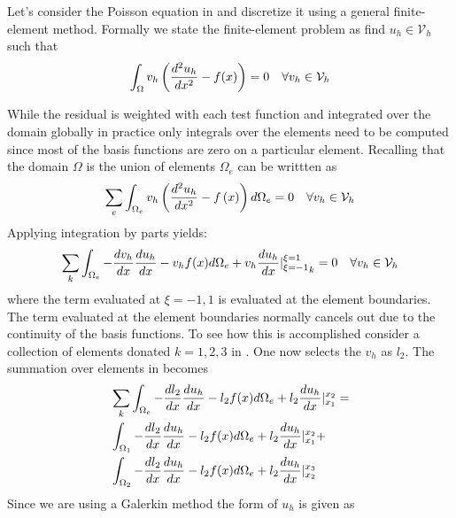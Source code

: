  Let's consider the Poisson equation in  and discretize it using a general finite-element method.  Formally we state the finite-element problem as find $u_{h} \in \mathcal{V}_{h}$ such that
\begin{equation}\label{eq:c2_pois_fem}
\int_{\Omega} v_{h} \left(  \frac{d^{2} u_{h}} {dx^{2}} - f(x)  \right) = 0 \quad \forall v_{h} \in \mathcal{V}_{h}
\end{equation}

While the residual is weighted with each test function and integrated over the domain globally in practice only integrals over the elements need to be computed since most of the basis functions are zero on a particular element.  Recalling that the domain $\Omega$ is the union of elements $\Omega_{e}$  can be writtten as 
\begin{equation}
\sum_{e} \int_{\Omega_{e}} v_{h} \left(  \frac{d^{2} u_{h}}{dx^{2}} - f\left( x \right) \right) d\Omega_{e} = 0 \quad \forall v_{h} \in \mathcal{V}_{h}
\end{equation}
Applying integration by parts yields:
\begin{equation}\label{eq:c2_pois_fem_weak}
\sum_{k}\int_{\Omega_{e} } -\frac{d v_{h}}{d x}\frac{d u_{h}}{d x} - v_{h} f(x) d \Omega_{e} + v_{h}\frac{d u_{h}}{d x} {\vert_{\xi = -1}^{\xi=1}}_{k}= 0 \quad \forall v_{h} \in \mathcal{V}_{h}
\end{equation}
 where the term evaluated at $\xi = -1,1$ is evaluated at the element boundaries.  The term evaluated at the element boundaries normally cancels out due to the continuity of the basis functions.  To see how this is accomplished consider a collection of elements donated $k = 1, 2, 3$ in .  One now selects the $v_{h}$ as $l_{2}$.  The summation over elements in  becomes 
 \begin{equation}
 \begin{split}
 & \sum_{k}\int_{\Omega_{e} } -\frac{d l_{2}}{d x}\frac{d u_{h}}{d x} - l_{2} f(x) d \Omega_{e} + l_{2}\frac{d u_{h}}{d x} \vert_{x_{1}}^{x_{2}}= \\
 & \int_{\Omega_{1} } -\frac{d l_{2}}{d x}\frac{d u_{h}}{d x} - l_{2} f(x) d \Omega_{e} + l_{2}\frac{d u_{h}}{d x}  \vert_{x_{1}}^{x_{2}} + \\ 
 & \int_{\Omega_{2} } -\frac{d l_{2}}{d x}\frac{d u_{h}}{d x} - l_{2} f(x) d \Omega_{e} + l_{2}\frac{d u_{h}}{d x}  \vert_{x_{2}}^{x_{3}}
 \end{split}
 \end{equation}
 Since we are using a Galerkin method the form of $u_{h}$ is given as 
